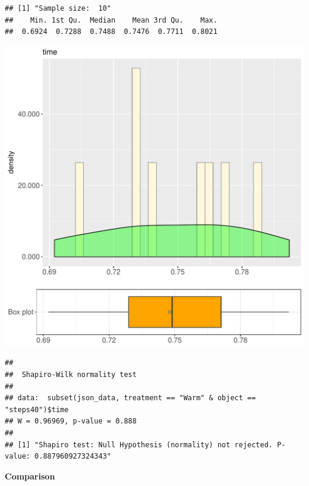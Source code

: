 \documentclass{article}\usepackage[]{graphicx}\usepackage[]{color}
\makeatletter
\def\maxwidth{ %
  \ifdim\Gin@nat@width>\linewidth
    \linewidth
  \else
    \Gin@nat@width
  \fi
}
\newenvironment{kframe}{%
 \def\at@end@of@kframe{}%
 \ifinner\ifhmode%
  \def\at@end@of@kframe{\end{minipage}}%
  \begin{minipage}{\columnwidth}%
 \fi\fi%
 \def\FrameCommand##1{\hskip\@totalleftmargin \hskip-\fboxsep
 \colorbox{shadecolor}{##1}\hskip-\fboxsep
     \hskip-\linewidth \hskip-\@totalleftmargin \hskip\columnwidth}%
 \MakeFramed {\advance\hsize-\width
   \@totalleftmargin\z@ \linewidth\hsize
   \@setminipage}}%
 {\par\unskip\endMakeFramed%
 \at@end@of@kframe}
\newenvironment{knitrout}{}{} %
\makeatother
\begin{document}
\begin{knitrout}
\color{fgcolor}\begin{kframe}
\begin{verbatim}
## [1] "Sample size:  10"
##    Min. 1st Qu.  Median    Mean 3rd Qu.    Max. 
##  0.6924  0.7288  0.7488  0.7476  0.7711  0.8021
\end{verbatim}
\end{kframe}
\includegraphics[width=\maxwidth]{figure/RH1_Warm_steps40-1} 
\begin{kframe}\begin{verbatim}
## 
## 	Shapiro-Wilk normality test
## 
## data:  subset(json_data, treatment == "Warm" & object == "steps40")$time
## W = 0.96969, p-value = 0.888
## 
## [1] "Shapiro test: Null Hypothesis (normality) not rejected. P-value: 0.887960927324343"
\end{verbatim}
\end{kframe}
\end{knitrout}
  
 \textbf{Comparison}
  
\end{document}

